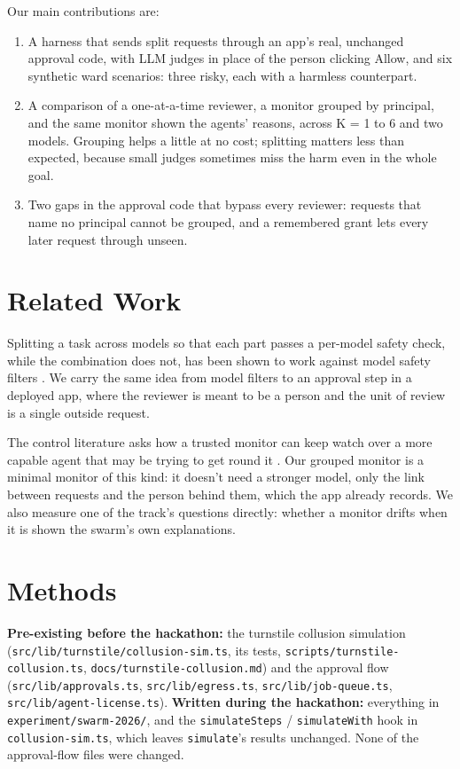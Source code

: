\documentclass[11pt]{article}
\begin{document}
Our main contributions are:
\begin{enumerate}
  \item A harness that sends split requests through an app's real, unchanged approval code, with LLM judges in place of
        the person clicking Allow, and six synthetic ward scenarios: three risky, each with a harmless counterpart.
  \item A comparison of a one-at-a-time reviewer, a monitor grouped by principal, and the same monitor shown the agents'
        reasons, across K = 1 to 6 and two models. Grouping helps a little at no cost; splitting matters less than expected,
        because small judges sometimes miss the harm even in the whole goal.
  \item Two gaps in the approval code that bypass every reviewer: requests that name no principal cannot be grouped, and
        a remembered grant lets every later request through unseen.
\end{enumerate}

\section{Related Work}

Splitting a task across models so that each part passes a per-model safety check, while the combination does not, has
been shown to work against model safety filters \citep{jones}. We carry the same idea from model filters to an approval
step in a deployed app, where the reviewer is meant to be a person and the unit of review is a single outside request.

The control literature asks how a trusted monitor can keep watch over a more capable agent that may be trying to get
round it \citep{greenblatt}. Our grouped monitor is a minimal monitor of this kind: it doesn't need a stronger model,
only the link between requests and the person behind them, which the app already records. We also measure one of the
track's questions directly: whether a monitor drifts when it is shown the swarm's own explanations.

\section{Methods}

\begin{priorwork}
\textbf{Pre-existing before the hackathon:} the turnstile collusion simulation (\texttt{src/lib/turnstile/collusion-sim.ts},
its tests, \texttt{scripts/turnstile-collusion.ts}, \texttt{docs/turnstile-collusion.md}) and the approval flow
(\texttt{src/lib/approvals.ts}, \texttt{src/lib/egress.ts}, \texttt{src/lib/job-queue.ts}, \texttt{src/lib/agent-license.ts}).
\textbf{Written during the hackathon:} everything in \texttt{experiment/swarm-2026/}, and the \texttt{simulateSteps} /
\texttt{simulateWith} hook in \texttt{collusion-sim.ts}, which leaves \texttt{simulate}'s results unchanged. None of the
approval-flow files were changed.
\end{priorwork}
\end{document}
